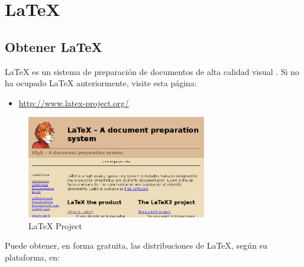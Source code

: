 
\chapter{\LaTeX}


\section{Obtener \LaTeX{}}

\LaTeX{} es un sistema de preparación de documentos de alta calidad
visual \citep{latex:whatis}. Si no ha ocupado \LaTeX{} anteriormente,
visite esta página:
\begin{itemize}
\item \href{http://www.latex-project.org/}{http://www.latex-project.org/}
\end{itemize}
\begin{figure}[H]
\begin{centering}
\includegraphics[width=0.7\textwidth]{figures/fig_latex_project_org}
\par\end{centering}

\caption{LaTeX Project}
\end{figure}


Puede obtener, en forma gratuita, las distribuciones de \LaTeX{},
según su plataforma, en:

